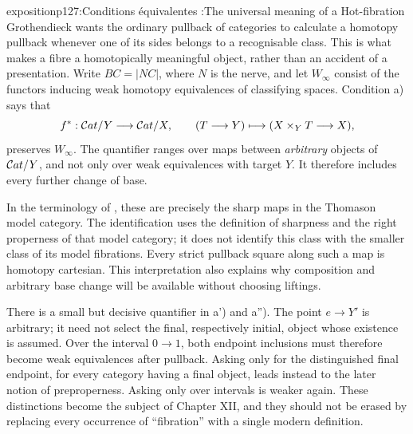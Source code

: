 \begin{dcomment}{exposition}{p127:Conditions équivalentes :}{The universal meaning of a Hot-fibration}
Grothendieck wants the ordinary pullback of categories to calculate a homotopy pullback whenever one of its sides belongs to a recognisable class. This is what makes a fibre a homotopically meaningful object, rather than an accident of a presentation. Write \(BC=|NC|\), where \(N\) is the nerve, and let \(W_\infty\) consist of the functors inducing weak homotopy equivalences of classifying spaces. Condition a) says that
\[
 f^*:\mathcal{C}at/Y\longrightarrow\mathcal{C}at/X,\qquad
 (T\longrightarrow Y)\longmapsto(X\times_Y T\longrightarrow X),
\]
preserves \(W_\infty\). The quantifier ranges over maps between \emph{arbitrary} objects of \(\mathcal{C}at/Y\), and not only over weak equivalences with target \(Y\). It therefore includes every further change of base.

In the terminology of \citet[\S2, Proposition 2.7]{Rezk1998Sharp}, these are precisely the sharp maps in the Thomason model category. The identification uses the definition of sharpness and the right properness of that model category; it does not identify this class with the smaller class of its model fibrations. Every strict pullback square along such a map is homotopy cartesian. This interpretation also explains why composition and arbitrary base change will be available without choosing liftings.

There is a small but decisive quantifier in a') and a''). The point \(e\longrightarrow Y'\) is arbitrary; it need not select the final, respectively initial, object whose existence is assumed. Over the interval \(0\longrightarrow1\), both endpoint inclusions must therefore become weak equivalences after pullback. Asking only for the distinguished final endpoint, for every category having a final object, leads instead to the later notion of preproperness. Asking only over intervals is weaker again. These distinctions become the subject of Chapter XII, and they should not be erased by replacing every occurrence of “fibration” with a single modern definition.
\end{dcomment}



